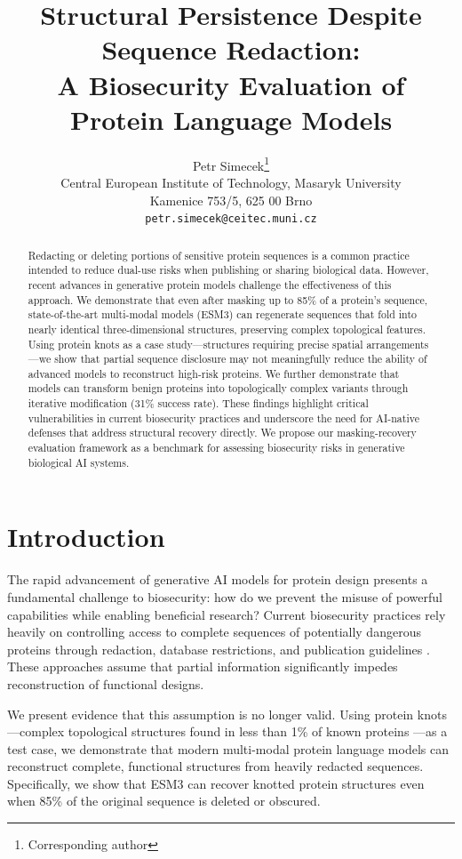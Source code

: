 \documentclass{article}
\title{Structural Persistence Despite Sequence Redaction:\\ A Biosecurity Evaluation of Protein Language Models}
\author{%
  Petr Simecek\thanks{Corresponding author} \\
  Central European Institute of Technology, Masaryk University\\
  Kamenice 753/5, 625 00 Brno\\
  \texttt{petr.simecek@ceitec.muni.cz} \\
}
\begin{document}
\maketitle

\begin{abstract}
Redacting or deleting portions of sensitive protein sequences is a common practice intended to reduce dual-use risks when publishing or sharing biological data. However, recent advances in generative protein models challenge the effectiveness of this approach. We demonstrate that even after masking up to 85\% of a protein's sequence, state-of-the-art multi-modal models (ESM3) can regenerate sequences that fold into nearly identical three-dimensional structures, preserving complex topological features. Using protein knots as a case study—structures requiring precise spatial arrangements—we show that partial sequence disclosure may not meaningfully reduce the ability of advanced models to reconstruct high-risk proteins. We further demonstrate that models can transform benign proteins into topologically complex variants through iterative modification (31\% success rate). These findings highlight critical vulnerabilities in current biosecurity practices and underscore the need for AI-native defenses that address structural recovery directly. We propose our masking-recovery evaluation framework as a benchmark for assessing biosecurity risks in generative biological AI systems.
\end{abstract}

\section{Introduction}

The rapid advancement of generative AI models for protein design presents a fundamental challenge to biosecurity: how do we prevent the misuse of powerful capabilities while enabling beneficial research? Current biosecurity practices rely heavily on controlling access to complete sequences of potentially dangerous proteins through redaction, database restrictions, and publication guidelines \cite{lewis2020biosecurity_attribution,igsc2024,schmidt2009synthetic,nsabb2007framework}. These approaches assume that partial information significantly impedes reconstruction of functional designs.

We present evidence that this assumption is no longer valid. Using protein knots—complex topological structures found in less than 1\% of known proteins \cite{taylor2000protein}—as a test case, we demonstrate that modern multi-modal protein language models can reconstruct complete, functional structures from heavily redacted sequences. Specifically, we show that ESM3 \cite{hayes2025simulating} can recover knotted protein structures even when 85\% of the original sequence is deleted or obscured.
\end{document}
